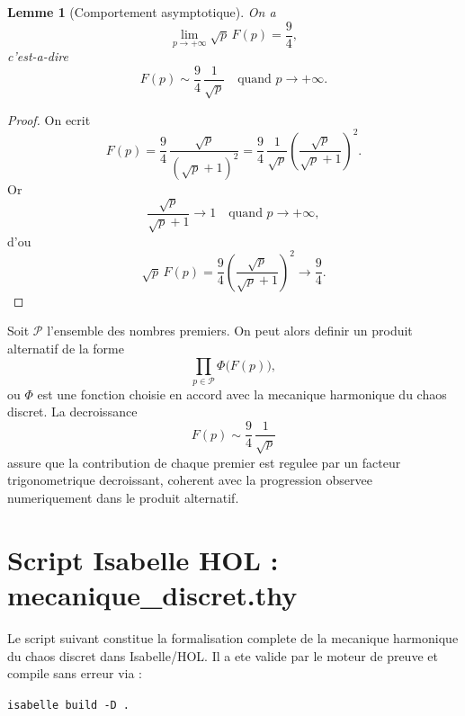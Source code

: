 \documentclass[12pt,a4paper]{article}
\newtheorem{lemma}{Lemme}
\theoremstyle{definition}
\theoremstyle{remark}
\begin{document}
\begin{lemma}[Comportement asymptotique]
On a
\[
\lim_{p \to +\infty} \sqrt{p}\,F(p) = \frac{9}{4},
\]
c'est-a-dire
\[
F(p) \sim \frac{9}{4}\,\frac{1}{\sqrt{p}}
\quad \text{quand } p \to +\infty.
\]
\end{lemma}

\begin{proof}
On ecrit
\[
F(p)
= \frac{9}{4}\,\frac{\sqrt{p}}{(\sqrt{p}+1)^{2}}
= \frac{9}{4}\,\frac{1}{\sqrt{p}}\left(\frac{\sqrt{p}}{\sqrt{p}+1}\right)^{2}.
\]
Or
\[
\frac{\sqrt{p}}{\sqrt{p}+1} \longrightarrow 1
\quad \text{quand } p \to +\infty,
\]
d'ou
\[
\sqrt{p}\,F(p)
= \frac{9}{4}\left(\frac{\sqrt{p}}{\sqrt{p}+1}\right)^{2}
\longrightarrow \frac{9}{4}.
\]
\end{proof}

Soit $\mathcal{P}$ l'ensemble des nombres premiers. On peut alors definir un produit alternatif de la forme
\[
\prod_{p \in \mathcal{P}} \Phi\bigl(F(p)\bigr),
\]
ou $\Phi$ est une fonction choisie en accord avec la mecanique harmonique du chaos discret.
La decroissance
\[
F(p) \sim \frac{9}{4}\,\frac{1}{\sqrt{p}}
\]
assure que la contribution de chaque premier est regulee par un facteur trigonometrique
decroissant, coherent avec la progression observee numeriquement dans le produit alternatif.

\section{Script Isabelle HOL : mecanique\_discret.thy}

Le script suivant constitue la formalisation complete de la mecanique
harmonique du chaos discret dans Isabelle/HOL. Il a ete valide par le
moteur de preuve et compile sans erreur via :

\texttt{isabelle build -D .}
\end{document}
